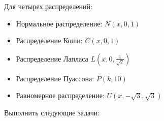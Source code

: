 Для четырех распределений:
\begin{itemize}
	\item Нормальное распределение: $N(x, 0, 1)$
	\item Распределение Коши: $C(x, 0, 1)$
	\item Распределение Лапласа $L(x, 0, \frac{1}{\sqrt{2}})$
	\item Распределение Пуассона: $P(k, 10)$
	\item Равномерное распределение: $U(x, -\sqrt{3}, \sqrt{3})$
\end{itemize}
Выполнить следующие задачи: